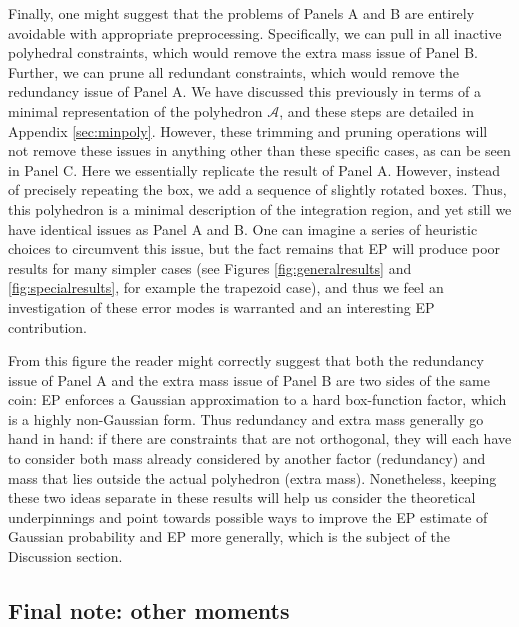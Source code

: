 \documentclass[twoside,11pt]{article}
\def\regionA{\mathcal{A}}
\begin{document}
Finally, one might suggest that the problems of Panels A and B are entirely avoidable with appropriate preprocessing.  Specifically, we can pull in all inactive polyhedral constraints, which would remove the extra mass issue of Panel B.  Further, we can prune all redundant constraints, which would remove the redundancy issue of Panel A.   We have discussed this previously in terms of a minimal representation of the polyhedron $\regionA$, and these steps are detailed in Appendix \ref{sec:minpoly}.  However, these trimming and pruning operations will not remove these issues in anything other than these specific cases, as can be seen in Panel C.  Here we essentially replicate the result of Panel A.  However, instead of precisely repeating the box, we add a sequence of slightly rotated boxes.  Thus, this polyhedron is a minimal description of the integration region, and yet still we have identical issues as Panel A and B.  One can imagine a series of heuristic choices to circumvent this issue, but the fact remains that EP will produce poor results for many simpler cases (see Figures \ref{fig:generalresults} and \ref{fig:specialresults}, for example the trapezoid case), and thus we feel an investigation of these error modes is warranted and an interesting EP contribution.

From this figure the reader might correctly suggest that both the redundancy issue of Panel A and the extra mass issue of Panel B are two sides of the same coin: EP enforces a Gaussian approximation to a hard box-function factor, which is a highly non-Gaussian form.  Thus redundancy and extra mass generally go hand in hand: if there are constraints that are not orthogonal, they will each have to consider both mass already considered by another factor (redundancy) and mass that lies outside the actual polyhedron (extra mass).   Nonetheless, keeping these two ideas separate in these results will help us consider the theoretical underpinnings and point towards possible ways to improve the EP estimate of Gaussian probability and EP more generally, which is the subject of the Discussion section.

\subsection{Final note: other moments}
\end{document}
